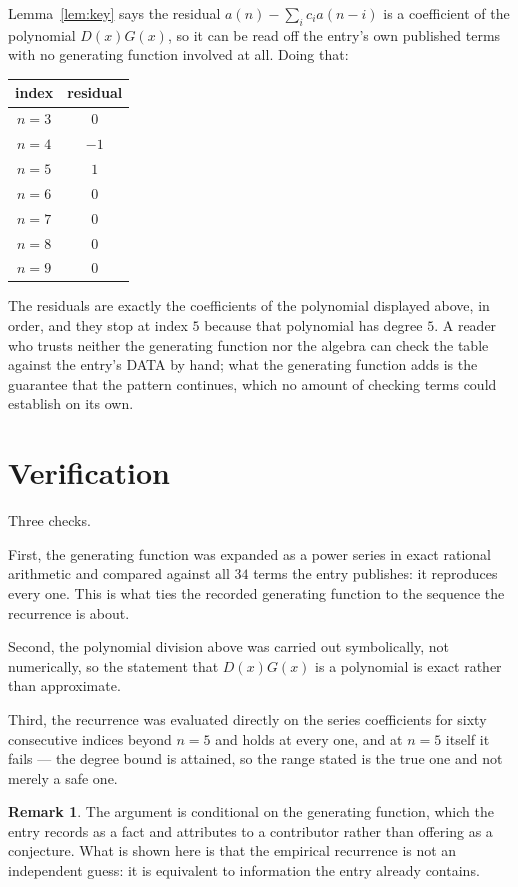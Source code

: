 \documentclass[11pt,a4paper]{article}
\theoremstyle{plain}
\theoremstyle{definition}
\newtheorem{remark}[theorem]{Remark}
\begin{document}
Lemma~\ref{lem:key} says the residual $a(n)-\sum_ic_ia(n-i)$ is a coefficient of the
polynomial $D(x)G(x)$, so it can be read off the entry's own published terms with no
generating function involved at all. Doing that:
\begin{center}
\begin{tabular}{cc}
index & residual \\ \hline
$n=3$ & $0$ \\
$n=4$ & $-1$ \\
$n=5$ & $1$ \\
$n=6$ & $0$ \\
$n=7$ & $0$ \\
$n=8$ & $0$ \\
$n=9$ & $0$
\end{tabular}
\end{center}
The residuals are exactly the coefficients of the polynomial displayed above, in order, and
they stop at index $5$ because that polynomial has degree $5$. A reader who trusts
neither the generating function nor the algebra can check the table against the entry's DATA
by hand; what the generating function adds is the guarantee that the pattern continues, which
no amount of checking terms could establish on its own.

\section{Verification}

Three checks.

First, the generating function was expanded as a power series in exact rational arithmetic and
compared against all $34$ terms the entry publishes: it reproduces every one. This is
what ties the recorded generating function to the sequence the recurrence is about.

Second, the polynomial division above was carried out symbolically, not numerically, so the
statement that $D(x)G(x)$ is a polynomial is exact rather than approximate.

Third, the recurrence was evaluated directly on the series coefficients for sixty consecutive
indices beyond $n=5$ and holds at every one, and at $n=5$ itself it fails --- the
degree bound is attained, so the range stated is the true one and not merely a safe one.

\begin{remark}
The argument is conditional on the generating function, which the entry records as a fact and
attributes to a contributor rather than offering as a conjecture. What is shown here is that
the empirical recurrence is not an independent guess: it is equivalent to information the
entry already contains.
\end{remark}
\end{document}
